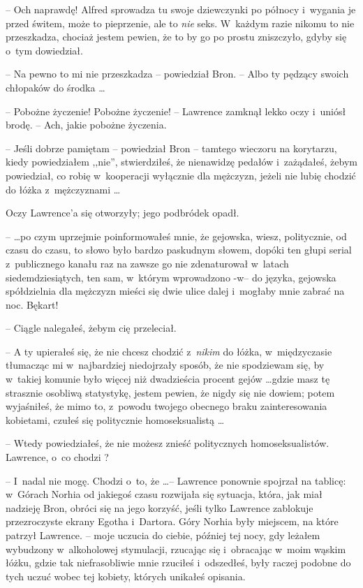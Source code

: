 \documentclass[oneside,polish,11pt,rmheadings]{mwbk}
\begin{document}
-- Och naprawdę! Alfred sprowadza tu swoje dziewczynki po północy i~wygania je przed świtem, może to pieprzenie, ale to \textit{nie }seks. W~każdym razie nikomu to nie przeszkadza, chociaż jestem pewien, że to by go po prostu zniszczyło, gdyby się o~tym dowiedział. 

-- Na pewno to mi nie przeszkadza -- powiedział Bron. -- Albo ty pędzący swoich chłopaków do środka  \ldots  

-- Pobożne życzenie! Pobożne życzenie! -- Lawrence zamknął lekko oczy i~uniósł brodę. -- Ach, jakie pobożne życzenia. 

-- Jeśli dobrze pamiętam -- powiedział Bron -- tamtego wieczoru na korytarzu, kiedy powiedziałem ,,nie'', stwierdziłeś, że nienawidzę pedałów i~zażądałeś, żebym powiedział, co robię w~kooperacji wyłącznie dla mężczyzn, jeżeli nie lubię chodzić do łóżka z~mężczyznami \ldots  

Oczy Lawrence'a się otworzyły; jego podbródek opadł. 

--  \ldots  po czym uprzejmie poinformowałeś mnie, że gejowska, wiesz, politycznie, od czasu do czasu, to słowo było bardzo paskudnym słowem, dopóki ten głupi serial z~publicznego kanału raz na zawsze go nie zdenaturował w~latach siedemdziesiątych, ten sam, w~którym wprowadzono -w-- do języka, gejowska spółdzielnia dla mężczyzn mieści się dwie ulice dalej i~mogłaby mnie zabrać na noc. Bękart! 

-- Ciągle nalegałeś, żebym cię przeleciał. 

-- A ty upierałeś się, że nie chcesz chodzić z~\textit{nikim }do łóżka, w~międzyczasie tłumacząc mi w~najbardziej niedojrzały sposób, że nie spodziewam się, by w~takiej komunie było więcej niż dwadzieścia procent gejów \ldots  gdzie masz tę strasznie osobliwą statystykę, jestem pewien, że nigdy się nie dowiem; potem wyjaśniłeś, że mimo to, z~powodu twojego obecnego braku zainteresowania kobietami, czułeś się politycznie homoseksualistą \ldots  

-- Wtedy powiedziałeś, że nie możesz znieść politycznych homoseksualistów. Lawrence, o~co chodzi ? 

-- I~nadal nie mogę. Chodzi o~to, że \ldots -- Lawrence ponownie spojrzał na tablicę: w~Górach Norhia od jakiegoś czasu rozwijała się sytuacja, która, jak miał nadzieję Bron, obróci się na jego korzyść, jeśli tylko Lawrence zablokuje przezroczyste ekrany Egotha i~Dartora. Góry Norhia były miejscem, na które patrzył Lawrence. -- moje uczucia do ciebie, później tej nocy, gdy leżałem wybudzony w~alkoholowej stymulacji, rzucając się i~obracając w~moim wąskim łóżku, gdzie tak niefrasobliwie mnie rzuciłeś i~odszedłeś, były raczej podobne do tych uczuć wobec tej kobiety, których unikałeś opisania. 
\end{document}
